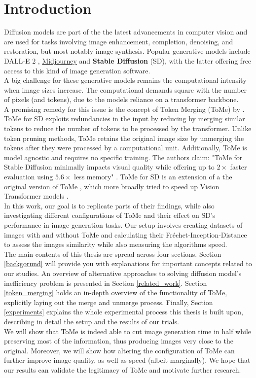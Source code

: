 \section{Introduction}
Diffusion models are part of the the latest advancements in computer vision and are used for tasks involving image enhancement, completion, denoising, and restoration, but most notably image synthesis. Popular generative models include DALL-E 2 \cite{ramesh2022hierarchical}, \href{https://www.midjourney.com}{Midjourney} and \textbf{Stable Diffusion} (SD), with the latter offering free access to this kind of image generation software.\\
A big challenge for these generative models remains the computational intensity when image sizes increase. The computational demands square with the number of pixels (and tokens), due to the models reliance on a transformer backbone.\\
A promising remedy for this issue is the concept of Token Merging (ToMe) by \cite{bolya2023tomesd}. ToMe for SD exploits redundancies in the input by reducing by merging similar tokens to reduce the number of tokens to be processed by the transformer. Unlike token pruning methods, ToMe retains the original image size by unmerging the tokens after they were processed by a computational unit. Additionally, ToMe is model agnostic and requires no specific training. The authors claim: "ToMe for Stable Diffusion minimally impacts visual quality while offering up to $2 \times$ faster evaluation using $5.6 \times$ less memory" \cite{bolya2023tomesd}. ToMe for SD is an extension of a the original version of ToMe \cite{bolya2023tome}, which more broadly tried to speed up Vision Transformer models \cite{dosovitskiy2020image}.\\
In this work, our goal is to replicate parts of their findings, while also investigating different configurations of ToMe and their effect on SD's performance in image generation tasks. Our setup involves creating datasets of images with and without ToMe and calculating their Fréchet-Inception-Distance to assess the images similarity while also measuring the algorithms speed.\\
The main contents of this thesis are spread across four sections. Section \ref{backgorund} will provide you with explanations for important concepts related to our studies. An overview of alternative approaches to solving diffusion model's inefficiency problem is presented in Section \ref{related_work}. Section \ref{token_merging} holds an in-depth overview of the functionality of ToMe, explicitly laying out the merge and unmerge process. Finally, Section \ref{experiments} explains the whole experimental process this thesis is built upon, describing in detail the setup and the results of our trials.\\
We will show that ToMe is indeed able to cut image generation time in half while preserving most of the information, thus producing images very close to the original. Moreover, we will show how altering the configuration of ToMe can further improve image quality, as well as speed (albeit marginally). We hope that our results can validate the legitimacy of ToMe and motivate further research.\\


